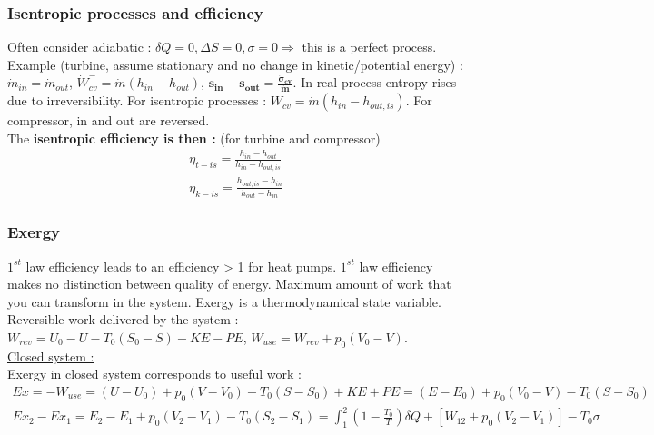 \documentclass[../main.tex]{subfiles}
\begin{document}
\subsubsection{Isentropic processes and efficiency}
Often consider adiabatic : $\delta Q = 0, \Delta S=0, \sigma = 0 \Rightarrow$ this is a perfect process.\\
Example (turbine, assume stationary and no change in kinetic/potential energy) : $\dot{m}_{in} = \dot{m}_{out}$, $\dot{W}^-_{cv} = \dot{m}(h_{in}-h_{out})$, $\mathbf{s_{in} - s_{out} = \frac{\dot{\sigma}_{cv}}{\dot{m}}}$. In real process entropy rises due to irreversibility. For isentropic processes : $\dot{W}^-_{cv} = \dot{m}(h_{in} - h_{out,is})$. \warning For compressor, in and out are reversed.\\

The \textbf{isentropic efficiency is then :} (for turbine and compressor) \begin{equation}\begin{gathered}
    \eta_{t-is} = \frac{h_{in}-h_{out}}{h_{in}-h_{out,is}}\\
    \eta_{k-is} = \frac{h_{out,is}-h_{in}}{h_{out}-h_{in}}
    \end{gathered}
\end{equation}

\subsubsection{Exergy}
$1^{st}$ law efficiency leads to an efficiency > 1 for heat pumps. $1^{st}$ law efficiency makes no distinction between quality of energy. Maximum amount of work that you can transform in the system. Exergy is a thermodynamical state variable.\\
Reversible work delivered by the system : $W_{rev} = U_0-U-T_0(S_0-S)- KE-PE$, $W_{use} = W_{rev} + p_0(V_0-V)$.\\

\quad \underline{Closed system :}\\
Exergy in closed system corresponds to useful work : \begin{equation} \begin{gathered}Ex = -W_{use} = (U-U_0) + p_0(V-V_0) - T_0(S-S_0) + KE + PE = (E-E_0)+p_0(V_0-V)-T_0(S-S_0)\\
Ex_2-Ex_1 = E_2-E_1 + p_0(V_2-V_1) - T_0(S_2-S_1) = \int_1^2 (1-\frac{T_0}{T})\delta Q + [W_{12} + p_0(V_2-V_1)] - T_0 \sigma\end{gathered}\end{equation}
\end{document}
